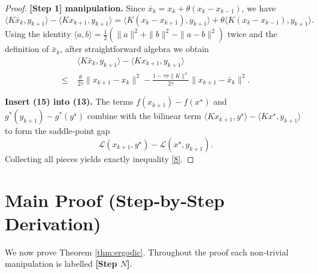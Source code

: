 \documentclass{article}
\begin{document}
\begin{proof}
\noindent\textbf{[Step 1] manipulation.} Since $\bar x_{k}=x_{k}+\theta(x_{k}-x_{k-1})$, we have
\[
\langle K\bar x_{k},y_{k+1}\rangle-\langle Kx_{k+1},y_{k+1}\rangle
= \langle K(x_{k}-x_{k+1}),y_{k+1}\rangle
+ \theta\langle K(x_{k}-x_{k-1}),y_{k+1}\rangle .
\tag{14}
\]
Using the identity $\langle a,b\rangle=\frac12(\|a\|^{2}+\|b\|^{2}-\|a-b\|^{2})$ twice and the definition of $\bar x_{k}$, after straightforward algebra we obtain
\[
\begin{aligned}
&\langle K\bar x_{k},y_{k+1}\rangle-\langle Kx_{k+1},y_{k+1}\rangle\\
\le\;&
\frac{\theta}{2\tau}\|x_{k+1}-x_{k}\|^{2}
-\frac{1-\tau\sigma\|K\|^{2}}{2\tau}\|x_{k+1}-\bar x_{k}\|^{2}.
\end{aligned}
\tag{15}
\]

\noindent\textbf{Insert (15) into (13).} The terms $f(x_{k+1})-f(x^{\star})$ and $g^{*}(y_{k+1})-g^{*}(y^{\star})$ combine with the bilinear term $\langle Kx_{k+1},y^{\star}\rangle-\langle Kx^{\star},y_{k+1}\rangle$ to form the saddle‑point gap
\[
\mathcal{L}(x_{k+1},y^{\star})-\mathcal{L}(x^{\star},y_{k+1}).
\tag{16}
\]
Collecting all pieces yields exactly inequality \eqref{8}. \qedhere
\end{proof}

\section*{Main Proof (Step‑by‑Step Derivation)}
We now prove Theorem \ref{thm:ergodic}. Throughout the proof each non‑trivial manipulation is labelled \textbf{[Step $N$]}.
\end{document}
